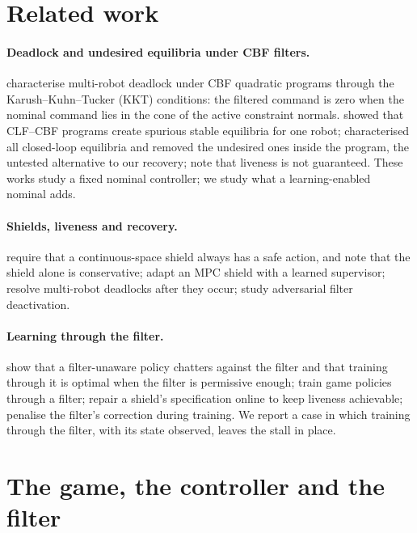 \documentclass{l4dc2027}
\begin{document}
\section{Related work}\label{sec:related}

\paragraph{Deadlock and undesired equilibria under CBF filters.} \citet{grover2020symmetry,grover2021deadlock,grover2023before} characterise multi-robot deadlock under CBF quadratic programs through the Karush--Kuhn--Tucker (KKT) conditions: the filtered command is zero when the nominal command lies in the cone of the active constraint normals. \citet{reis2021cbfqp} showed that CLF--CBF programs create spurious stable equilibria for one robot; \citet{tan2024undesired} characterised all closed-loop equilibria and removed the undesired ones inside the program, the untested alternative to our recovery; \citet{reis2026stability,reis2025unified} note that liveness is not guaranteed. These works study a fixed nominal controller; we study what a learning-enabled nominal adds.

\paragraph{Shields, liveness and recovery.} \citet{kim2025realizable} require that a continuous-space shield always has a safe action, and note that the shield alone is conservative; \citet{dawood2025dynamic} adapt an MPC shield with a learned supervisor; \citet{wang2025neurosymbolic} resolve multi-robot deadlocks after they occur; \citet{arnstrom2025stealthy} study adversarial filter deactivation.

\paragraph{Learning through the filter.} \citet{oh2026provably} show that a filter-unaware policy chatters against the filter and that training through it is optimal when the filter is permissive enough; \citet{wu2026competence} train game policies through a filter; \citet{georgescu2026gr1} repair a shield's specification online to keep liveness achievable; \citet{pizarro2025filtering} penalise the filter's correction during training. We report a case in which training through the filter, with its state observed, leaves the stall in place.

\section{The game, the controller and the filter}\label{sec:setting}
\end{document}
